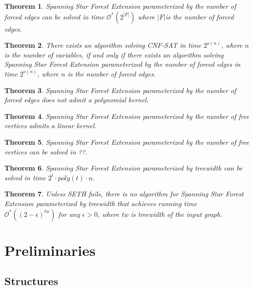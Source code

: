 \documentclass[en]{pracamgr}
\newtheorem{theorem}{Theorem}
\theoremstyle{definition}
\newcommand{\ssfep}{{\sc Spanning Star Forest Extension}}
\newcommand{\cnfsat}{{\sc CNF-SAT}}
\begin{document}
\begin{theorem}\label{thm-ssfep-fe-time}
	\ssfep{} parameterized by the number of forced edges can be solved in time $\mathcal{O}^*(2^{|F|})$ where $|F|$is the number of forced edges.
\end{theorem}

\begin{theorem}\label{thm-ssfep-seth}
	There exists an algorithm solving \cnfsat{} in time $2^{o(n)}$, where $n$ is the number of variables, if and only if there exists an algorithm solving \ssfep{} parameterized by the number of forced edges in time $2^{o(n)}$, where $n$ is the number of forced edges.
\end{theorem}

\begin{theorem}\label{thm-ssfep-nokernel}
	\ssfep{} parameterized by the number of forced edges does not admit a polynomial kernel.
\end{theorem}

\begin{theorem}\label{thm-ssfep-kernel}
	\ssfep{} parameterized by the number of free vertices admits a linear kernel.
\end{theorem}

\begin{theorem}\label{thm-ssfep-free-alg}
	\ssfep{} parameterized by the number of free vertices can be solved in ??.%
\end{theorem}

\begin{theorem}\label{thm-ssfep-tw-time}
	\ssfep{} parameterized by treewidth can be solved in time $2^t\cdot poly(t)\cdot n$.
\end{theorem}

\begin{theorem}\label{thm-ssfep-tw-seth}
	Unless SETH fails, there is no algorithm for \ssfep{} parameterized by treewidth that achieves running time $\mathcal{O}^*((2-\epsilon)^{tw})$ for any $\epsilon > 0$, where \textup{\textrm{tw}} is treewidth of the input graph.
\end{theorem}

\chapter{Preliminaries}

\section{Structures}
\end{document}
